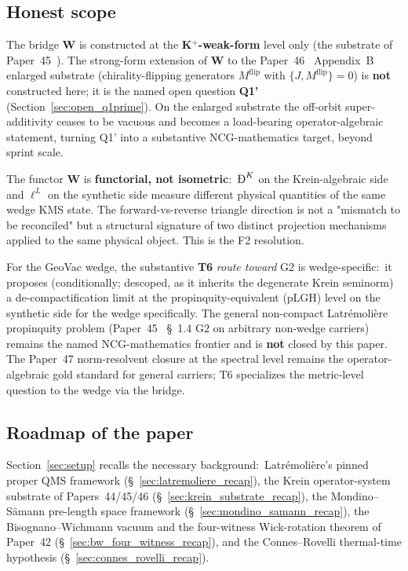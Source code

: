 \documentclass[11pt,a4paper]{article}
\theoremstyle{plain}
\theoremstyle{definition}
\newcommand{\BigDeth}{\text{\DJ}^{K}}
\newcommand{\Wfun}{\mathbf{W}}
\begin{document}
\subsection{Honest scope}
\label{sec:honest_scope}

The bridge $\Wfun$ is constructed at the \textbf{K$^{+}$-weak-form}
level only (the substrate of Paper~45~\cite{paper45}). The strong-form
extension of $\Wfun$ to the Paper~46~\cite{paper46} Appendix~B
enlarged substrate (chirality-flipping generators $M^{\mathrm{flip}}$
with $\{J, M^{\mathrm{flip}}\} = 0$) is \textbf{not} constructed here;
it is the named open question \textbf{Q1'} (Section~\ref{sec:open_q1prime}).
On the enlarged substrate the off-orbit super-additivity ceases to be
vacuous and becomes a load-bearing operator-algebraic statement,
turning Q1' into a substantive NCG-mathematics target, beyond sprint
scale.

The functor $\Wfun$ is \textbf{functorial, not isometric}:\
$\BigDeth$ on the Krein-algebraic side and $\ell^{L}$ on the synthetic
side measure different physical quantities of the same wedge KMS
state. The forward-vs-reverse triangle direction is not a "mismatch
to be reconciled" but a structural signature of two distinct
projection mechanisms applied to the same physical object. This is
the F2 resolution.

For the GeoVac wedge, the substantive \textbf{T6} \emph{route toward}
$\mathrm{G2}$ is wedge-specific:\ it proposes (conditionally; descoped, as
it inherits the degenerate Krein seminorm) a de-compactification
limit at the propinquity-equivalent (pLGH) level on the synthetic side
for the wedge specifically. The general non-compact Latr\'emoli\`ere
propinquity problem (Paper~45~\cite{paper45} \S~1.4 $\mathrm{G2}$ on
arbitrary non-wedge carriers) remains the named NCG-mathematics
frontier and is \textbf{not} closed by this paper. The Paper~47
\cite{paper47} norm-resolvent closure at the spectral level remains
the operator-algebraic gold standard for general carriers; T6
specializes the metric-level question to the wedge via the bridge.

\subsection{Roadmap of the paper}
\label{sec:roadmap}

Section~\ref{sec:setup} recalls the necessary background:\
Latr\'emoli\`ere's pinned proper QMS framework
(\S~\ref{sec:latremoliere_recap}), the Krein operator-system substrate
of Papers~44/45/46 (\S~\ref{sec:krein_substrate_recap}), the
Mondino--S\"amann pre-length space framework
(\S~\ref{sec:mondino_samann_recap}), the Bisognano--Wichmann vacuum
and the four-witness Wick-rotation theorem of Paper~42
(\S~\ref{sec:bw_four_witness_recap}), and the Connes--Rovelli
thermal-time hypothesis (\S~\ref{sec:connes_rovelli_recap}).
\end{document}
